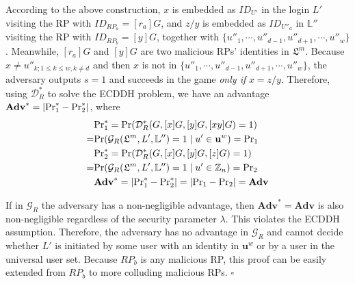 According to the above construction, %
$x$ is embedded as $ID_{U'}$ in the login $L'$ visiting the RP with $ID_{RP_{a}} = [r_{a}]G$,
and $z/y$ is embedded as $ID_{U''_d}$ in $\mathbb{L}''$ visiting the RP with $ID_{RP_{b}}=[y]G$,
together with $\{u''_1, \cdots, u''_{d-1}, u''_{d+1}, \cdots, u''_w\}$.
Meanwhile, $[r_{a}]G$ and $[y]G$ are two malicious RPs' identities in $\mathfrak{L}^m$.
Because $x \neq u''_{k; 1\leq k \leq w, k \neq d}$ and then $x$ is not in $\{u''_1, \cdots, u''_{d-1}, u''_{d+1}, \cdots, u''_w\}$, the adversary outputs $s=1$ and succeeds in the game \emph{only if} $x = z/y$.
 Therefore, using $\mathcal{D}^*_R$ to solve the ECDDH problem, we have an advantage $\mathbf{Adv}^*=|{\rm Pr}^*_1 - {\rm Pr}^*_2|$, where
\begin{align*}
&{\rm Pr}^*_1 =  {\rm Pr}(\mathcal{D}^*_R(G, [x]G, [y]G, [xy]G)=1) \\
=&{\rm Pr}(\mathcal{G}_R(\mathfrak{L}^m, L', \mathbb{L}'')=1 \; | \; u' \in \mathbf{u}^w) = {\rm Pr}_1 \\
&{\rm Pr}^*_2= {\rm Pr}(\mathcal{D}^*_R(G, [x]G, [y]G, [z]G)=1) \\
=&{\rm Pr}(\mathcal{G}_R(\mathfrak{L}^m, L', \mathbb{L}'')=1 \; | \; u' \in \mathbb{Z}_n) = {\rm Pr}_2 \\
&\mathbf{Adv}^*=|{\rm Pr}^*_1-{\rm Pr}^*_2|=|{\rm Pr}_1-{\rm Pr}_2|={\mathbf{Adv}}
\end{align*}

If in $\mathcal{G}_R$ the adversary has a non-negligible advantage, then $\mathbf{Adv}^*={\mathbf{Adv}}$ is also non-negligible regardless of the security parameter $\lambda$. This violates the ECDDH assumption.
 Therefore, the adversary has no advantage in $\mathcal{G}_R$ and cannot decide whether $L'$ is initiated by some user with an identity in $\mathbf{u}^w$ or by a user in the universal user set.
Because $RP_b$ is any malicious RP, this proof can be easily extended from $RP_b$ to more colluding malicious RPs.
\hfill $\square$


